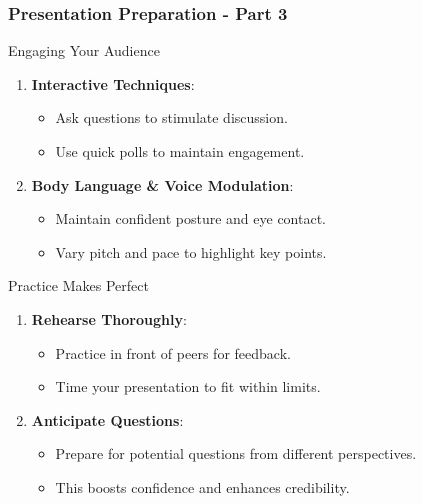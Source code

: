 \documentclass[aspectratio=169]{beamer}
\begin{document}
\begin{frame}[fragile]
    \frametitle{Presentation Preparation - Part 3}
    
    \begin{block}{Engaging Your Audience}
        \begin{enumerate}
            \item \textbf{Interactive Techniques}:
            \begin{itemize}
                \item Ask questions to stimulate discussion.
                \item Use quick polls to maintain engagement.
            \end{itemize}
            
            \item \textbf{Body Language \& Voice Modulation}:
            \begin{itemize}
                \item Maintain confident posture and eye contact.
                \item Vary pitch and pace to highlight key points.
            \end{itemize}
        \end{enumerate}
    \end{block}
    
    \begin{block}{Practice Makes Perfect}
        \begin{enumerate}
            \item \textbf{Rehearse Thoroughly}:
            \begin{itemize}
                \item Practice in front of peers for feedback.
                \item Time your presentation to fit within limits.
            \end{itemize}
            
            \item \textbf{Anticipate Questions}:
            \begin{itemize}
                \item Prepare for potential questions from different perspectives.
                \item This boosts confidence and enhances credibility.
            \end{itemize}
        \end{enumerate}
    \end{block}

\end{frame}
\end{document}
